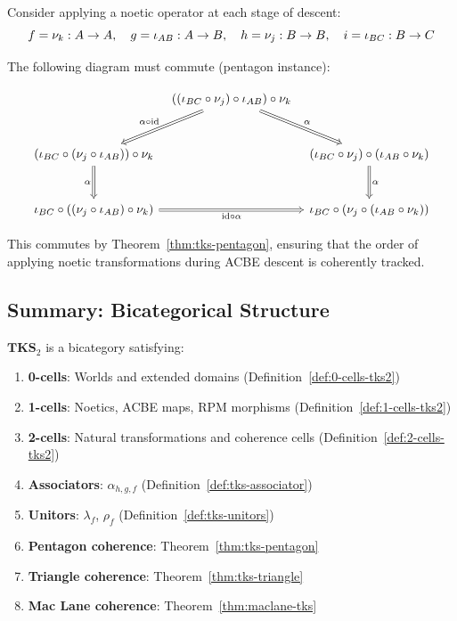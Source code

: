 \begin{example}
\label{ex:mixed-coherence}
Consider applying a noetic operator at each stage of descent:
\[
  f = \nu_{k} : A \to A, \quad
  g = \iota_{AB} : A \to B, \quad
  h = \nu_{j} : B \to B, \quad
  i = \iota_{BC} : B \to C
\]

The following diagram must commute (pentagon instance):

\[
\begin{tikzcd}[column sep=tiny, row sep=large]
  & ((\iota_{BC} \circ \noe{j}) \circ \iota_{AB}) \circ \noe{k}
    \arrow[dl, Rightarrow, "\alpha \circ \mathrm{id}"']
    \arrow[dr, Rightarrow, "\alpha"]
  & \\
  (\iota_{BC} \circ (\noe{j} \circ \iota_{AB})) \circ \noe{k}
    \arrow[d, Rightarrow, "\alpha"']
  & &
  (\iota_{BC} \circ \noe{j}) \circ (\iota_{AB} \circ \noe{k})
    \arrow[d, Rightarrow, "\alpha"]
  \\
  \iota_{BC} \circ ((\noe{j} \circ \iota_{AB}) \circ \noe{k})
    \arrow[rr, Rightarrow, "\mathrm{id} \circ \alpha"']
  & &
  \iota_{BC} \circ (\noe{j} \circ (\iota_{AB} \circ \noe{k}))
\end{tikzcd}
\]

This commutes by Theorem~\ref{thm:tks-pentagon}, ensuring that the order of applying
noetic transformations during ACBE descent is coherently tracked.
\end{example}

\subsection{Summary: Bicategorical Structure}

\begin{proposition}
\label{prop:tks-bicategory}
$\mathbf{TKS}_2$ is a bicategory satisfying:
\begin{enumerate}
  \item \textbf{0-cells}: Worlds and extended domains (Definition~\ref{def:0-cells-tks2})
  \item \textbf{1-cells}: Noetics, ACBE maps, RPM morphisms (Definition~\ref{def:1-cells-tks2})
  \item \textbf{2-cells}: Natural transformations and coherence cells (Definition~\ref{def:2-cells-tks2})
  \item \textbf{Associators}: $\alpha_{h,g,f}$ (Definition~\ref{def:tks-associator})
  \item \textbf{Unitors}: $\lambda_f$, $\rho_f$ (Definition~\ref{def:tks-unitors})
  \item \textbf{Pentagon coherence}: Theorem~\ref{thm:tks-pentagon}
  \item \textbf{Triangle coherence}: Theorem~\ref{thm:tks-triangle}
  \item \textbf{Mac Lane coherence}: Theorem~\ref{thm:maclane-tks}
\end{enumerate}
\end{proposition}


